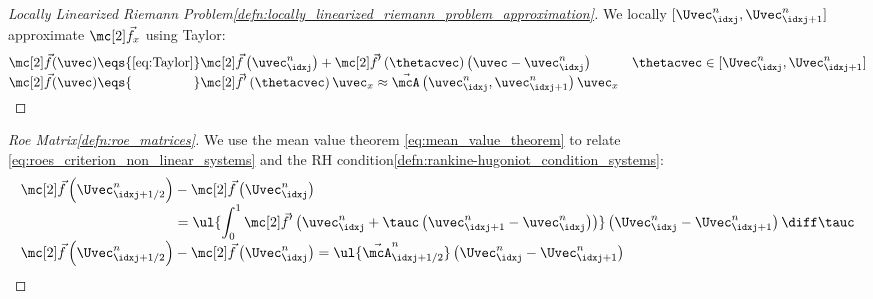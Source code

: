 \begin{proofbox}\nospacing
    \begin{proof}[Locally Linearized Riemann Problem\cref{defn:locally_linearized_riemann_problem_approximation}]\label{proof:defn:locally_linearized_riemann_problem_approximation}
        We locally $[\Uvec_{\idxj}^{n},\Uvec_{\idxj+1}^{n}]$ approximate $\fluxvec_{x}$ using Taylor:
        \begin{align*}
          \fluxvec(\uvec)\eqs{\cref{eq:Taylor}}&\fluxvec \left(\uvec_{\idxj}^{n}\right)+\fluxvec' \left(\thetacvec\right)\left(\uvec-\uvec_{\idxj}^{n}\right)&&\thetacvec\in[\Uvec_{\idxj}^{n},\Uvec_{\idxj+1}^{n}]\\[-1\jot]
          \fluxvec(\uvec)\eqs{\hphantom{\cref{eq:Taylor}}}&\fluxvec'\left(\thetacvec\right)\uvec_{x}\approx\linfluxvec\left(\uvec_{\idxj}^{n},\uvec_{\idxj+1}^{n}\right)\uvec_{x}\\[-1\jot]
        \end{align*}
    \end{proof}
\end{proofbox}
\begin{proofbox}\nospacing
    \begin{proof}[Roe Matrix\cref{defn:roe_matrices}]\label{proof:defn:roe_matrices}
        We use the mean value theorem \cref{eq:mean_value_theorem} to relate \cref{eq:roes_criterion_non_linear_systems} and
        the RH condition\cref{defn:rankine-hugoniot_condition_systems}:
        \begin{align*}
          \fluxvec\left(\Uvec_{\idxj+1/2}^{n}\right)&-\fluxvec\left(\Uvec_{\idxj}^{n}\right)\\[-1\jot]
          &=\ul{\int_{0}^{1}\fluxvec' \left(\uvec_{\idxj}^{n}+\tauc \left(\uvec_{\idxj+1}^{n}-\uvec_{\idxj}^{n}\right)\right)}\left(\Uvec_{\idxj}^{n}-\Uvec_{\idxj+1}^{n}\right)\diff\tauc \\[-1\jot]
          \fluxvec\left(\Uvec_{\idxj+1/2}^{n}\right)&-\fluxvec\left(\Uvec_{\idxj}^{n}\right)=\ul{\linfluxvec_{\idxj+1/2}^{n}}\left(\Uvec_{\idxj}^{n}-\Uvec_{\idxj+1}^{n}\right)
        \end{align*}
    \end{proof}
\end{proofbox}
